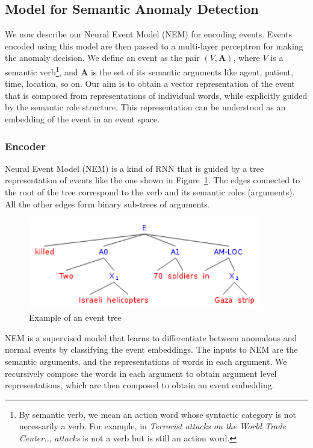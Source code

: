 \subsection{Model for Semantic Anomaly Detection}
We now describe our Neural Event Model (NEM) for encoding events. Events encoded using this model are then passed to a multi-layer perceptron
for making the anomaly decision. We define an event as the pair $(V, \textbf{A})$, where $V$
is a semantic verb\footnote{By semantic verb, we mean an action word whose
syntactic category is not necessarily a verb.  
For example, in \textit{Terrorist attacks on the World Trade Center..},
\textit{attacks} is not a verb but is still an 
action word.}, and $\textbf{A}$ is the set of its semantic arguments like agent,
patient, time, location, so on. Our aim
is to obtain a vector representation of the event that is composed from
representations of individual words, while explicitly guided by the semantic
role structure.
This representation can be understood as an embedding of the
event
in an event space.  

\subsubsection{Encoder}
Neural Event Model (NEM) is a kind of RNN
that is guided by a tree representation of events like the one shown in
Figure~\ref{fig:nem_event_tree}.  The edges 
connected to the root of the tree correspond to the verb and its semantic roles
(arguments).  All the other edges form binary sub-trees of arguments.  
\begin{figure}
  \begin{center}
  \includegraphics[width=4in]{figures/event_tree.png}
  \caption{Example of an event tree}
  \label{fig:nem_event_tree}
  \end{center}
 \end{figure}
NEM is a supervised model that learns to differentiate between anomalous and
normal events by 
classifying the event embeddings.  
The inputs to NEM are the semantic arguments, and the representations of words
in 
each argument.  We recursively compose the words in each argument to obtain
argument level
representations, which are then composed to obtain an event embedding. 

